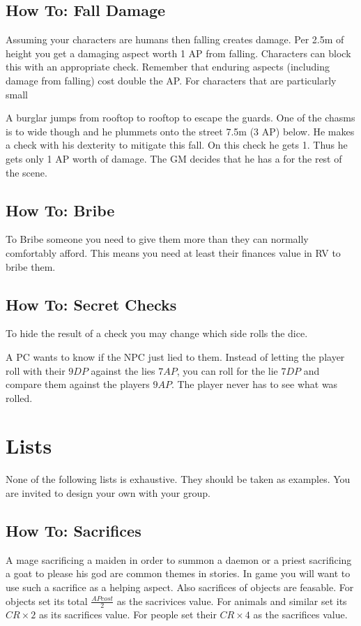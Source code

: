 \documentclass[11pt]{article}
\begin{document}
{\subsection{How To: Fall Damage}
\label{sec:org0a9cc71}
Assuming your characters are humans then falling creates damage. Per 2.5m of height you get a damaging aspect worth 1 AP from falling. Characters can block this with an appropriate check. Remember that enduring aspects (including damage from falling) cost double the AP.
For characters that are particularly small

\begin{pwexample}
A burglar jumps from rooftop to rooftop to escape the guards. One of the chasms is to wide though and he plummets onto the street 7.5m (3 AP) below. He makes a check with his dexterity to mitigate this fall. On this check he gets 1. Thus he gets only 1 AP worth of damage. The GM decides that he has a  for the rest of the scene.
\end{pwexample}
\subsection{How To: Bribe}
\label{sec:org8a2e905}
To Bribe someone you need to give them more than they can normally comfortably afford. This means you need at least their finances value in RV to bribe them.
\subsection{How To: Secret Checks}
\label{sec:orgd4285ca}
To hide the result of a check you may change which side rolls the dice.

\begin{pwexample}
A PC wants to know if the NPC just lied to them. Instead of letting the player roll with their \(9 DP\) against the lies \(7 AP\), you can roll for the lie \(7 DP\) and compare them against the players \(9 AP\). The player never has to see what was rolled.
\end{pwexample}
\section{Lists}
\label{sec:orga03d4f9}
None of the following lists is exhaustive. They should be taken as examples. You are invited to design your own with your group.
\subsection{How To: Sacrifices}
\label{sec:org33df3c5}
A mage sacrificing a maiden in order to summon a daemon or a priest sacrificing a goat to please his god are common themes in stories. In game you will want to use such a sacrifice as a helping aspect. Also sacrifices of objects are feasable. For objects set its total \(\frac{AP cost}{2}\) as the sacrivices value. For animals and similar set its \(CR \times 2\) as its sacrifices value. For people set their \(CR \times 4\) as the sacrifices value.
}
\end{document}
